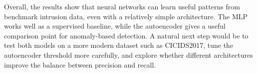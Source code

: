 \documentclass[11pt]{article}
\begin{document}
Overall, the results show that neural networks can learn useful patterns from benchmark intrusion data, even with a relatively simple architecture. The MLP works well as a supervised baseline, while the autoencoder gives a useful comparison point for anomaly-based detection. A natural next step would be to test both models on a more modern dataset such as CICIDS2017, tune the autoencoder threshold more carefully, and explore whether different architectures improve the balance between precision and recall.
\end{document}
